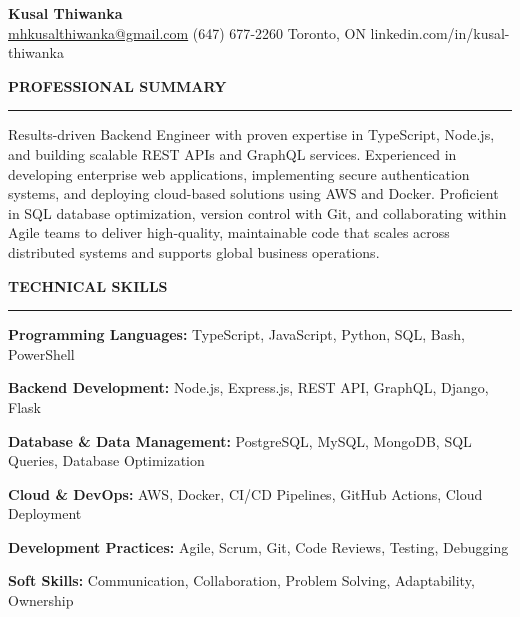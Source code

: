 \documentclass[10pt,letterpaper]{article}
\begin{document}
\begin{center}
{\LARGE\textbf{Kusal Thiwanka}}\\[3pt]
\href{mailto:mhkusalthiwanka@gmail.com}{mhkusalthiwanka@gmail.com}\hspace{2em}%
(647) 677{-}2260\hspace{2em}%
Toronto, ON\hspace{2em}
linkedin.com/in/kusal-thiwanka
\end{center}

\vspace{6pt}

\textbf{PROFESSIONAL SUMMARY}\\[-8pt]
\noindent\rule{\textwidth}{1pt}

\vspace{-2pt}

Results-driven Backend Engineer with proven expertise in TypeScript, Node.js, and building scalable REST APIs and GraphQL services. Experienced in developing enterprise web applications, implementing secure authentication systems, and deploying cloud-based solutions using AWS and Docker. Proficient in SQL database optimization, version control with Git, and collaborating within Agile teams to deliver high-quality, maintainable code that scales across distributed systems and supports global business operations.

\vspace{8pt}

\textbf{TECHNICAL SKILLS}\\[-8pt]
\noindent\rule{\textwidth}{1pt}

\vspace{-2pt}

\textbf{Programming Languages:} TypeScript, JavaScript, Python, SQL, Bash, PowerShell

\textbf{Backend Development:} Node.js, Express.js, REST API, GraphQL, Django, Flask

\textbf{Database \& Data Management:} PostgreSQL, MySQL, MongoDB, SQL Queries, Database Optimization

\textbf{Cloud \& DevOps:} AWS, Docker, CI/CD Pipelines, GitHub Actions, Cloud Deployment

\textbf{Development Practices:} Agile, Scrum, Git, Code Reviews, Testing, Debugging

\textbf{Soft Skills:} Communication, Collaboration, Problem Solving, Adaptability, Ownership

\vspace{8pt}
\end{document}
